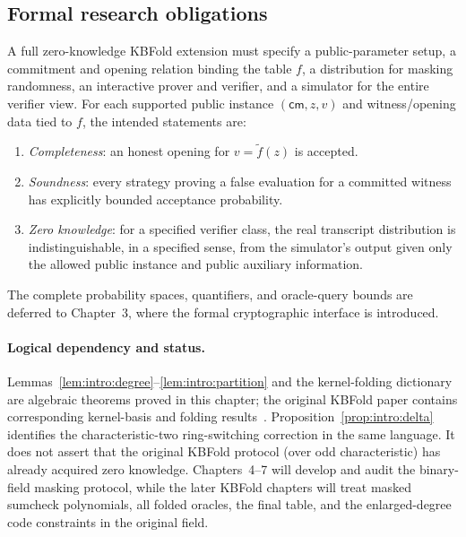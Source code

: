 \subsection{Formal research obligations}\label{sec:intro:goals}

\begin{definition}\label{def:intro:target}
A full zero-knowledge KBFold extension must specify a public-parameter setup, a commitment and opening relation binding the table $f$, a distribution for masking randomness, an interactive prover and verifier, and a simulator for the entire verifier view. For each supported public instance $(\mathsf{cm},z,v)$ and witness/opening data tied to $f$, the intended statements are:
\begin{enumerate}[label=\textup{(\roman*)}]
\item \emph{Completeness}: an honest opening for $v=\widetilde f(z)$ is accepted.
\item \emph{Soundness}: every strategy proving a false evaluation for a committed witness has explicitly bounded acceptance probability.
\item \emph{Zero knowledge}: for a specified verifier class, the real transcript distribution is indistinguishable, in a specified sense, from the simulator's output given only the allowed public instance and public auxiliary information.
\end{enumerate}
The complete probability spaces, quantifiers, and oracle-query bounds are deferred to Chapter~3, where the formal cryptographic interface is introduced.
\end{definition}

\paragraph{Logical dependency and status.} Lemmas~\ref{lem:intro:degree}--\ref{lem:intro:partition} and the kernel-folding dictionary are algebraic theorems proved in this chapter; the original KBFold paper contains corresponding kernel-basis and folding results~\cite{MkhidaKBFold2026}. Proposition~\ref{prop:intro:delta} identifies the characteristic-two ring-switching correction in the same language. It does not assert that the original KBFold protocol (over odd characteristic) has already acquired zero knowledge. Chapters~4--7 will develop and audit the binary-field masking protocol, while the later KBFold chapters will treat masked sumcheck polynomials, all folded oracles, the final table, and the enlarged-degree code constraints in the original field.

